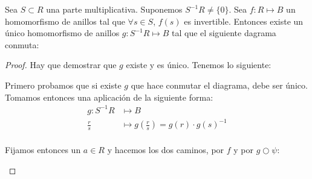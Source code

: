 	\begin{theorem} \label{thm:PropUniversalLoc}
		Sea $S\subset R$ una parte multiplicativa. Suponemos $S^{-1}R \neq \{0\}$. Sea $f:R \longmapsto B$ un homomorfismo de anillos tal que $\forall s \in S$, $f(s)$ es invertible. Entonces existe un único homomorfismo de anillos $g: S^{-1}R \longmapsto B$ tal que el siguiente dagrama conmuta:

		
	\end{theorem}

	\begin{proof}
		Hay que demostrar que $g$ existe y es único. Tenemos lo siguiente:



		Primero probamos que si existe $g$ que hace conmutar el diagrama, debe ser único. Tomamos entonces una aplicación de la siguiente forma:
		\begin{align*}
			g: S^{-1}R & \longmapsto  B\\
			\frac{r}{s} & \longmapsto g\left( \frac{r}{s} \right)=g(r)\cdot g(s)^{-1} \\
		\end{align*}

		Fijamos entonces un $a ∈ R$ y hacemos los dos caminos, por $f$ y por $g○ψ$:

		\begin{center}
\end{center}
\end{proof}
